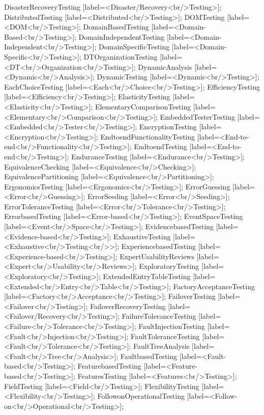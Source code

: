 \documentclass{article}
\begin{document}
{DisasterRecoveryTesting [label=<Disaster/Recovery<br/>Testing>];
DistributedTesting [label=<Distributed<br/>Testing>];
DOMTesting [label=<DOM<br/>Testing>];
DomainBasedTesting [label=<Domain-Based<br/>Testing>];
DomainIndependentTesting [label=<Domain-Independent<br/>Testing>];
DomainSpecificTesting [label=<Domain-Specific<br/>Testing>];
DTOrganizationTesting [label=<DT<br/>Organization<br/>Testing>];
DynamicAnalysis [label=<Dynamic<br/>Analysis>];
DynamicTesting [label=<Dynamic<br/>Testing>];
EachChoiceTesting [label=<Each<br/>Choice<br/>Testing>];
EfficiencyTesting [label=<Efficiency<br/>Testing>];
ElasticityTesting [label=<Elasticity<br/>Testing>];
ElementaryComparisonTesting [label=<Elementary<br/>Comparison<br/>Testing>];
EmbeddedTesterTesting [label=<Embedded<br/>Tester<br/>Testing>];
EncryptionTesting [label=<Encryption<br/>Testing>];
EndtoendFunctionalityTesting [label=<End-to-end<br/>Functionality<br/>Testing>];
EndtoendTesting [label=<End-to-end<br/>Testing>];
EnduranceTesting [label=<Endurance<br/>Testing>];
EquivalenceChecking [label=<Equivalence<br/>Checking>];
EquivalencePartitioning [label=<Equivalence<br/>Partitioning>];
ErgonomicsTesting [label=<Ergonomics<br/>Testing>];
ErrorGuessing [label=<Error<br/>Guessing>];
ErrorSeeding [label=<Error<br/>Seeding>];
ErrorToleranceTesting [label=<Error<br/>Tolerance<br/>Testing>];
ErrorbasedTesting [label=<Error-based<br/>Testing>];
EventSpaceTesting [label=<Event<br/>Space<br/>Testing>];
EvidencebasedTesting [label=<Evidence-based<br/>Testing>];
ExhaustiveTesting [label=<Exhaustive<br/>Testing<br/>>];
ExperiencebasedTesting [label=<Experience-based<br/>Testing>];
ExpertUsabilityReviews [label=<Expert<br/>Usability<br/>Reviews>];
ExploratoryTesting [label=<Exploratory<br/>Testing>];
ExtendedEntryTableTesting [label=<Extended<br/>Entry<br/>Table<br/>Testing>];
FactoryAcceptanceTesting [label=<Factory<br/>Acceptance<br/>Testing>];
FailoverTesting [label=<Failover<br/>Testing>];
FailoverRecoveryTesting [label=<Failover/Recovery<br/>Testing>];
FailureToleranceTesting [label=<Failure<br/>Tolerance<br/>Testing>];
FaultInjectionTesting [label=<Fault<br/>Injection<br/>Testing>];
FaultToleranceTesting [label=<Fault<br/>Tolerance<br/>Testing>];
FaultTreeAnalysis [label=<Fault<br/>Tree<br/>Analysis>];
FaultbasedTesting [label=<Fault-based<br/>Testing>];
FeaturebasedTesting [label=<Feature-based<br/>Testing>];
FeaturesTesting [label=<Features<br/>Testing>];
FieldTesting [label=<Field<br/>Testing>];
FlexibilityTesting [label=<Flexibility<br/>Testing>];
FollowonOperationalTesting [label=<Follow-on<br/>Operational<br/>Testing>];
}
\end{document}
